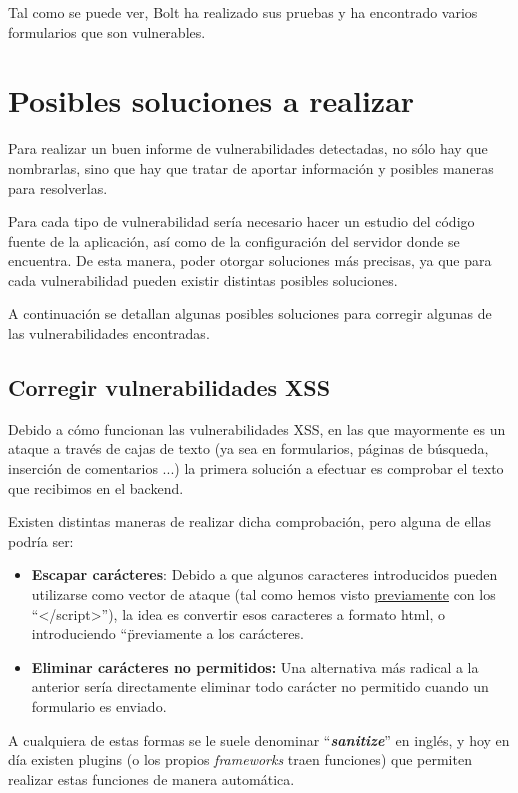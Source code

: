 \documentclass{\ClassPath/viu-tfm-template}
\begin{document}
Tal como se puede ver, Bolt ha realizado sus pruebas y ha encontrado varios formularios que son vulnerables.


\chapter{Posibles soluciones a realizar}
Para realizar un buen informe de vulnerabilidades detectadas, no sólo hay que nombrarlas, sino que hay que tratar de aportar información y posibles maneras para resolverlas.

Para cada tipo de vulnerabilidad sería necesario hacer un estudio del código fuente de la aplicación, así como de la configuración del servidor donde se encuentra. De esta manera, poder otorgar soluciones más precisas, ya que para cada vulnerabilidad pueden existir distintas posibles soluciones.

A continuación se detallan algunas posibles soluciones para corregir algunas de las vulnerabilidades encontradas.

\section{Corregir vulnerabilidades XSS}
Debido a cómo funcionan las vulnerabilidades XSS, en las que mayormente es un ataque a través de cajas de texto (ya sea en formularios, páginas de búsqueda, inserción de comentarios ...) la primera solución a efectuar es comprobar el texto que recibimos en el backend.

Existen distintas maneras de realizar dicha comprobación, pero alguna de ellas podría ser:

\begin{itemize}
    \item \textbf{Escapar carácteres}: Debido a que algunos caracteres introducidos pueden utilizarse como vector de ataque (tal como hemos visto \hyperlink{vulnerabilidad_xss}{previamente} con los “</script>”), la idea es convertir esos caracteres a formato html, o introduciendo “\" previamente a los carácteres.

    \item \textbf{Eliminar carácteres no permitidos:} Una alternativa más radical a la anterior sería directamente eliminar todo carácter no permitido cuando un formulario es enviado.
\end{itemize}

A cualquiera de estas formas  se le suele denominar “\textbf{\textit{sanitize}}” en inglés, y hoy en día existen plugins (o los propios \textit{frameworks} traen funciones) que permiten realizar estas funciones de manera automática.
\end{document}
